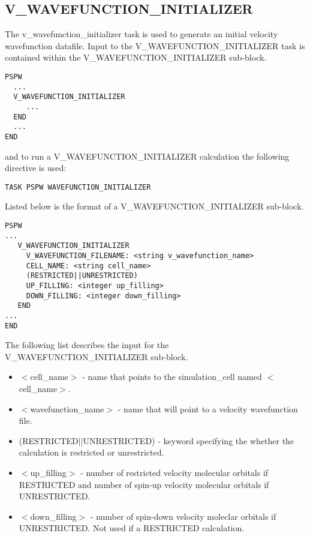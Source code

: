 \subsection{V\_WAVEFUNCTION\_INITIALIZER}
The v\_wavefunction\_initializer task is used to generate an initial velocity 
wavefunction datafile.
Input to the V\_WAVEFUNCTION\_INITIALIZER task is contained
within the V\_WAVEFUNCTION\_INITIALIZER sub-block.
\begin{verbatim}
PSPW
  ...
  V_WAVEFUNCTION_INITIALIZER
     ...
  END
  ...
END
\end{verbatim}
and to run a V\_WAVEFUNCTION\_INITIALIZER calculation the following directive 
is used:
\begin{verbatim}
TASK PSPW WAVEFUNCTION_INITIALIZER
\end{verbatim}
Listed below is the format of a V\_WAVEFUNCTION\_INITIALIZER sub-block.
\begin{verbatim}
PSPW
... 
   V_WAVEFUNCTION_INITIALIZER
     V_WAVEFUNCTION_FILENAME: <string v_wavefunction_name>
     CELL_NAME: <string cell_name>
     (RESTRICTED||UNRESTRICTED)
     UP_FILLING: <integer up_filling>
     DOWN_FILLING: <integer down_filling>
   END
...
END
\end{verbatim}
The following list describes the input for the V\_WAVEFUNCTION\_INITIALIZER
sub-block.
\begin{itemize}
	\item $<$cell\_name$>$ - name that points 
		to the simulation\_cell named $<$cell\_name$>$.
	\item $<$wavefunction\_name$>$ - name that will point
              to a velocity wavefunction file.
	\item (RESTRICTED$||$UNRESTRICTED) - keyword specifying the whether
              the calculation is restricted or unrestricted.
	\item $<$up\_filling$>$ - number of restricted velocity molecular 
	      orbitals if RESTRICTED and number of spin-up velocity molecular 
              orbitals if UNRESTRICTED.
        \item $<$down\_filling$>$ - number of spin-down velocity moleclar 
              orbitals if UNRESTRICTED.  Not used if a RESTRICTED calculation.
\end{itemize}



